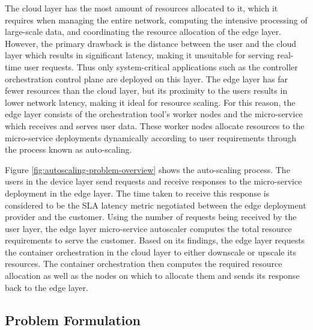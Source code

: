 The cloud layer has the most amount of resources allocated to it, which it requires when managing the entire network, computing the intensive processing of large-scale data, and coordinating the resource allocation of the edge layer. However, the primary drawback is the distance between the user and the cloud layer which results in significant latency, making it unsuitable for serving real-time user requests. Thus only system-critical applications such as the controller orchestration control plane are deployed on this layer. The edge layer has far fewer resources than the cloud layer, but its proximity to the users results in lower network latency, making it ideal for resource scaling. For this reason, the edge layer consists of the orchestration tool's worker nodes and the micro-service which receives and serves user data. These worker nodes allocate resources to the micro-service deployments dynamically according to user requirements through the process known as auto-scaling.\par

Figure \ref{fig:autoscaling-problem-overview} shows the auto-scaling process. The users in the device layer send requests and receive responses to the micro-service deployment in the edge layer. The time taken to receive this response is considered to be the SLA latency metric negotiated between the edge deployment provider and the customer. Using the number of requests being received by the user layer, the edge layer micro-service autoscaler computes the total resource requirements to serve the customer. Based on its findings, the edge layer requests the container orchestration in the cloud layer to either downscale or upscale its resources. The container orchestration then computes the required resource allocation as well as the nodes on which to allocate them and sends its response back to the edge layer.\par

\subsection{Problem Formulation}
\label{subsec:ch3-problem-formulation}

